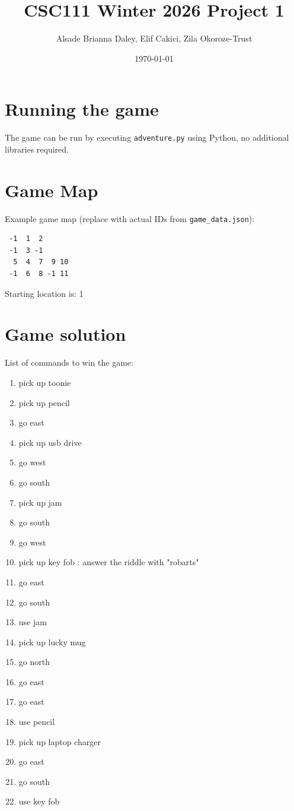\documentclass[11pt]{article}
\title{CSC111 Winter 2026 Project 1}
\author{Alsade Brianna Daley, Elif Cakici, Zila Okoroze-Trust}
\date{\today}
\begin{document}
\maketitle

\section{Running the game}
The game can be run by executing \texttt{adventure.py} using Python, no additional libraries required.

\section*{Game Map}
Example game map (replace with actual IDs from \texttt{game\_data.json}):

\begin{verbatim}
 -1  1  2
 -1  3 -1
  5  4  7  9 10
 -1  6  8 -1 11
\end{verbatim}

Starting location is: 1

\section*{Game solution}
List of commands to win the game:
\begin{enumerate}
    \item pick up toonie
    \item pick up pencil
    \item go east
    \item pick up usb drive
    \item go west
    \item go south
    \item pick up jam
    \item go south
    \item go west
    \item pick up key fob  : answer the riddle with "robarts"
    \item go east
    \item go south
    \item use jam
    \item pick up lucky mug
    \item go north
    \item go east
    \item go east
    \item use pencil
    \item pick up laptop charger
    \item go east
    \item go south
    \item use key fob
\end{enumerate}
\end{document}
